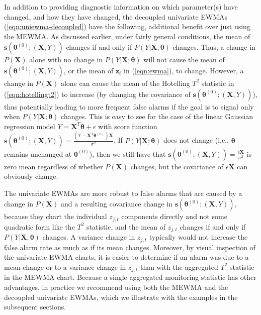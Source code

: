 \documentclass[twoside,11pt]{article}
\begin{document}
In addition to providing diagnostic information on which parameter(s) have changed, and how they have changed, the decoupled univariate EWMAs (\ref{eqn:uniewma-decoupled}) have the following, additional benefit over just using the MEWMA. As discussed earlier, under fairly general conditions, the mean of $\bm{s}(\bm { \theta}^{ (0)}; (\bm {X}, Y))$ changes if and only if $P(Y|\bm{X};\bm{\theta})$ changes. Thus, a change in $P(\bm{X})$ alone with no change in $P(Y|\bm{X};\bm{\theta})$ will not cause the mean of $\bm{s}(\bm { \theta}^{ (0)}; (\bm {X}, Y))$, or the mean of $\bm{z}_t$ in (\ref{eqn:ewma}), to change. However, a change in $P(\bm{X})$ alone can cause the mean of the Hotelling $T^2$ statistic in (\ref{eqn:hotellingt2}) to increase (by changing the covariance of $\bm{s}(\bm { \theta}^{ (0)}; (\bm {X}, Y))$), thus potentially leading to more frequent false alarms if the goal is to signal only when $P(Y|\bm{X};\bm{\theta})$ changes. This is easy to see for the case of the linear Gaussian regression model $Y = \bm{X}^T\bm{\theta} + \epsilon$ with score function $\bm{s}(\bm { \theta}^{ (0)}; (\bm {X}, Y)) = \frac{(Y - \bm{X}^T\bm{\theta}^{ (0)})\bm{X}}{\sigma^2}$. If $P(Y|\bm{X};\bm{\theta})$ does not change (i.e., $\bm{\theta}$ remains unchanged at $\bm{\theta}^{ (0)}$), then we still have that $\bm{s}(\bm { \theta}^{ (0)}; (\bm {X}, Y)) = \frac{\epsilon \bm{X}}{\sigma^2}$ is zero mean regardless of whether $P(\bm{X})$ changes, but the covariance of $\epsilon \bm{X}$ can obviously change.   

The univariate EWMAs are more robust to false alarms that are caused by a change in $P(\bm{X})$ and a resulting covariance change in $\bm{s}(\bm { \theta}^{ (0)}; (\bm {X}, Y))$, because they chart the individual $z_{j,t}$ components directly and not some quadratic form like the $T^2$ statistic, and the mean of $z_{j,t}$ changes if and only if $P(Y|\bm{X};\bm{\theta})$ changes. A variance change in $z_{j,t}$ typically would not increase the false alarm rate as much as if its mean changes. Moreover, by visual inspection of the univariate EWMA charts, it is easier to determine if an alarm was due to a mean change or to a variance change in $z_{j,t}$ than with the aggregated $T^2$ statistic in the MEWMA chart.  Because a single aggregated monitoring statistic has other advantages, in practice we recommend using both the MEWMA and the decoupled univariate EWMAs, which we illustrate with the examples in the subsequent sections. 
\end{document}
